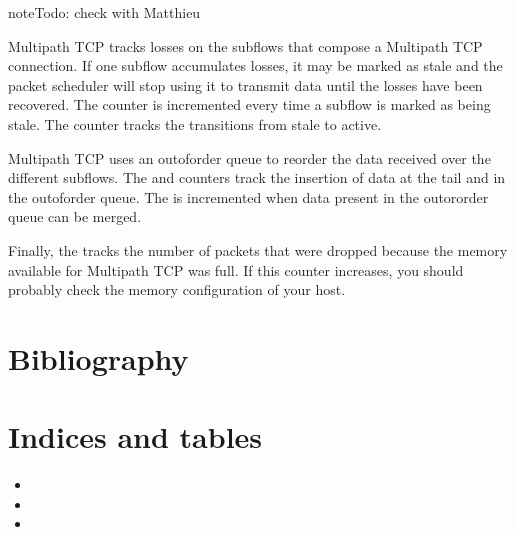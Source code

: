 \documentclass[letterpaper,10pt,english]{sphinxmanual}
\begin{document}
\begin{sphinxadmonition}{note}{\label{\detokenize{nstat-mptcp:id5}}Todo:}
\sphinxAtStartPar
check with Matthieu
\end{sphinxadmonition}

\sphinxAtStartPar
Multipath TCP tracks losses on the subflows that compose a Multipath
TCP connection. If one subflow accumulates losses, it may be marked
as stale and the packet scheduler will stop using it to transmit data
until the losses have been recovered. The  counter is
incremented every time a subflow is marked as being stale. The
 counter tracks the transitions from stale to
active.

\sphinxAtStartPar
Multipath TCP uses an out\sphinxhyphen{}of\sphinxhyphen{}order queue to reorder the data received over
the different subflows. The  and    counters track the insertion of data at the tail and in the out\sphinxhyphen{}of\sphinxhyphen{}order
queue. The  is incremented when data present in the
out\sphinxhyphen{}or\sphinxhyphen{}order queue can be merged.

\sphinxAtStartPar
Finally, the  tracks the number of packets that
were dropped because the memory available for Multipath TCP was full.
If this counter increases, you should probably check the memory configuration
of your host.


\chapter{Bibliography}
\label{\detokenize{biblio:bibliography}}\label{\detokenize{biblio::doc}}

\chapter{Indices and tables}
\label{\detokenize{index:indices-and-tables}}\begin{itemize}
\item {} 
\sphinxAtStartPar
{}

\item {} 
\sphinxAtStartPar
{}

\item {} 
\sphinxAtStartPar
{}

\end{itemize}
\end{document}
